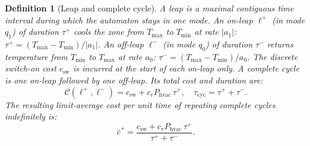 \documentclass[12pt,a4paper]{article}
\newtheorem{definition}{Definition}
\newcommand{\Tmin}{T_{\min}}
\newcommand{\Tmax}{T_{\max}}
\newcommand{\csw}{c_{\mathrm{sw}}}
\newcommand{\Phvac}{P_{\mathrm{hvac}}}
\newcommand{\taup}{\tau^{+}}
\newcommand{\taum}{\tau^{-}}
\begin{document}
\begin{definition}[Leap and complete cycle]
\label{def:leap}
A \emph{leap} is a maximal contiguous time interval during which the
automaton stays in one mode.
An \emph{on-leap} $\ell^+$ (in mode $q_1$) of duration $\taup$ cools
the zone from $\Tmax$ to $\Tmin$ at rate $|a_1|$:
$\taup=({\Tmax-\Tmin})/{|a_1|}$.
An \emph{off-leap} $\ell^-$ (in mode $q_0$) of duration $\taum$ returns
temperature from $\Tmin$ to $\Tmax$ at rate $a_0$:
$\taum=({\Tmax-\Tmin})/{a_0}$.
The discrete switch-on cost $\csw$ is incurred at the start of each
on-leap only.
A \emph{complete cycle} is one on-leap followed by one off-leap.
Its total cost and duration are:
\begin{equation}
  \mathcal{C}(\ell^+,\ell^-)
  = \csw + c_r\Phvac\,\taup,
  \quad
  \tau_{\mathrm{cyc}} = \taup+\taum.
  \label{eq:cycle_cost}
\end{equation}
The resulting \emph{limit-average cost per unit time} of repeating
complete cycles indefinitely is:
\begin{equation}
  \bar{c}^{\,*}
  = \frac{\csw+c_r\Phvac\,\taup}{\,\taup+\taum\,}.
  \label{eq:cstar}
\end{equation}
\end{definition}
\end{document}
